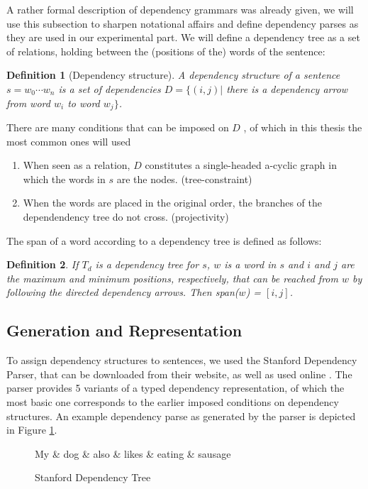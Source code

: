 \documentclass{report}
\theoremstyle{break}
\newtheorem{definition}{Definition}
\begin{document}
A rather formal description of dependency grammars was already given, we will use this subsection to sharpen notational affairs and define dependency parses as they are used in our experimental part. We will define a dependency tree as a set of relations, holding between the (positions of the) words of the sentence:

\begin{definition}[Dependency structure]
A dependency structure of a sentence $s = w_0\cdots w_n$ is a set of dependencies $D = \{ (i,j) |$ there is a dependency arrow from word $w_i$ to word $w_j \}$. 
\end{definition}

There are many conditions that can be imposed on $D$ \citep{de2006generating}, of which in this thesis the most common ones will used\begin{enumerate}
\item When seen as a relation, $D$ constitutes a single-headed a-cyclic graph in which the words in $s$ are the nodes. (tree-constraint)
\item When the words are placed in the original order, the branches of the dependendency tree do not cross. (projectivity)
\end{enumerate}

The span of a word according to a dependency tree is defined as follows:

\begin{definition}
If $T_d$ is a dependency tree for $s$, $w$ is a word in $s$ and $i$ and $j$ are the maximum and minimum positions, respectively, that can be reached from $w$ by following the directed dependency arrows. Then span($w$) = $[i,j]$. 
\end{definition}

\subsection{Generation and Representation}

To assign dependency structures to sentences, we used the Stanford Dependency Parser, that can be downloaded from their website, as well as used online  \citep{de2006generating}. The parser provides 5 variants of a typed dependency representation, of which the most basic one corresponds to the earlier imposed conditions on dependency structures. An example dependency parse as generated by the parser is depicted in Figure \ref{fig:deptree1}.

\begin{figure}[!h]\label{fig:deptree1}
\centering
\begin{dependency}[theme=simple]%
\begin{deptext}[column sep=.5cm, row sep=.1ex]
My \& dog \& also \& likes \& eating \& sausage \\
\end{deptext}
\end{dependency}
\caption{Stanford Dependency Tree}
\end{figure}
\end{document}
